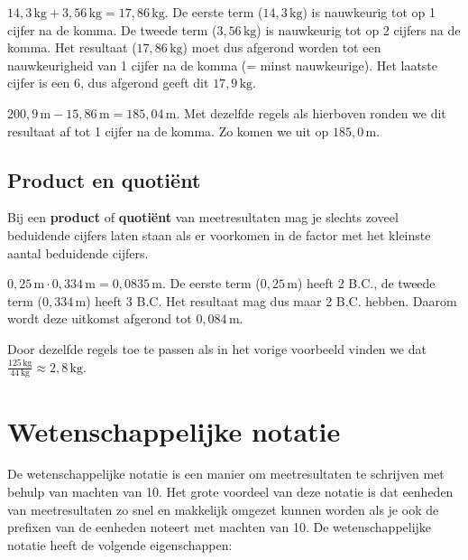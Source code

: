 \documentclass{ximera}
\begin{document}
\begin{example}[title={B.C. Plus}]\nl
    $14{,}3 \, \mathrm{kg} + 3{,}56 \, \mathrm{kg} = 17{,}86 \, \mathrm{kg}$. De eerste term ($14{,}3 \, \mathrm{kg}$) is nauwkeurig tot op 1 cijfer na de komma. De tweede term ($3{,}56 \, \mathrm{kg}$) is nauwkeurig tot op 2 cijfers na de komma. Het resultaat ($17{,}86 \, \mathrm{kg}$) moet dus afgerond worden tot een nauwkeurigheid van 1 cijfer na de komma (= minst nauwkeurige). Het laatste cijfer is een 6, dus afgerond geeft dit $17{,}9 \, \mathrm{kg}$.
\end{example}

\begin{example}[title={B.C. Min}]\nl
    $200{,}9 \, \mathrm{m} - 15{,}86 \, \mathrm{m} = 185{,}04 \, \mathrm{m}$. Met dezelfde regels als hierboven ronden we dit resultaat af tot 1 cijfer na de komma. Zo komen we uit op $185{,}0 \, \mathrm{m}$.
\end{example}

\subsection{Product en quotiënt}
\begin{proposition}\nl
    Bij een \textbf{product} of \textbf{quotiënt} van meetresultaten mag je slechts zoveel beduidende cijfers laten staan als er voorkomen in de factor met het kleinste aantal beduidende cijfers.
\end{proposition}

\begin{example}[title={B.C. Product}]\nl
    $0{,}25 \, \mathrm{m} \cdot 0{,}334 \, \mathrm{m} = 0{,}0835 \, \mathrm{m}$. De eerste term ($0{,}25 \, \mathrm{m}$) heeft 2 B.C., de tweede term ($0{,}334 \, \mathrm{m}$) heeft 3 B.C. Het resultaat mag dus maar 2 B.C. hebben. Daarom wordt deze uitkomst afgerond tot $0{,}084 \, \mathrm{m}$.
\end{example}

\begin{example}[title={B.C. Quotiënt}]\nl
    Door dezelfde regels toe te passen als in het vorige voorbeeld vinden we dat $\frac{125 \, \mathrm{kg}}{44 \, \mathrm{kg}} \approx 2{,}8 \, \mathrm{kg}$.
\end{example}

\section{Wetenschappelijke notatie}
De wetenschappelijke notatie is een manier om meetresultaten te schrijven met behulp van machten van 10. Het grote voordeel van deze notatie is dat eenheden van meetresultaten zo snel en makkelijk omgezet kunnen worden als je ook de prefixen van de eenheden noteert met machten van 10. De wetenschappelijke notatie heeft de volgende eigenschappen:
\end{document}
